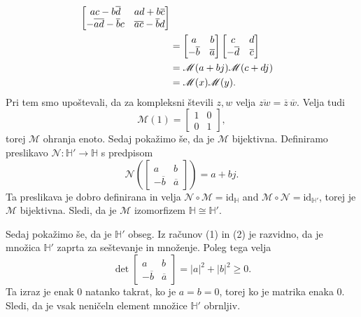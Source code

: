 \documentclass[mat1, tisk]{fmfdelo}
\numberwithin{equation}{section}
\begin{document}
\begin{dokaz}
\begin{equation*}
\begin{aligned}
\begin{bmatrix}
                    ac - b\overline{d} & ad + b\overline{c}\\
                    - \overline{ad} - \overline{b}c & {\overline{ac} - \overline{b}d}
                \end{bmatrix}\\
                &= \begin{bmatrix}
                    a & b\\
                    - \overline{b} & \overline{a}
                \end{bmatrix}
                \begin{bmatrix}
                    c & d\\
                    - \overline{d} & \overline{c}
                \end{bmatrix}\\
                &= \mathscr{M}(a+bj)\mathscr{M}(c+dj)\\
                &= \mathscr{M}(x)\mathscr{M}(y).
            \end{aligned}\\
    \end{equation*} Pri tem smo upoštevali, da za kompleksni števili $z,w$ velja $\overline{zw} = \overline{z}\,\overline{w}$.
    Velja tudi
    $$\mathscr{M}(1) = 
    \begin{bmatrix}
        1 & 0 \\
        0 & 1
    \end{bmatrix},$$
    torej $\mathscr{M}$ ohranja enoto. Sedaj pokažimo še, da je $\mathscr{M}$ bijektivna. Definiramo preslikavo \(\mathscr{N}:\mathbb{H}'\to\mathbb{H}\) s predpisom
    \[
    \mathscr{N}\!\left(
    \begin{bmatrix}
    a & b\\
    -\overline{b} & \overline{a}
    \end{bmatrix}
    \right)=a+bj.
    \]
    Ta preslikava je dobro definirana in velja
    \(\mathscr{N}\circ\mathscr{M}=\mathrm{id}_{\mathbb{H}}\) and 
    \(\mathscr{M}\circ\mathscr{N}=\mathrm{id}_{\mathbb{H}'}\), torej je \(\mathscr{M}\) bijektivna. Sledi, da je \(\mathscr{M}\) izomorfizem \(\mathbb{H} \cong \mathbb{H}'\).

    \medskip
    Sedaj pokažimo še, da je $\mathbb{H}'$ obseg. Iz računov (1) in (2) je razvidno, da je množica $\mathbb{H}'$ zaprta za seštevanje in množenje. Poleg tega
    velja
    $$\det 
    \begin{bmatrix}
        a & b\\
        - \overline{b} & \overline{a}
    \end{bmatrix}
    = |a|^2 + |b|^2 \geq 0.$$
    Ta izraz je enak 0 natanko takrat, ko je $a = b = 0$, torej ko je matrika enaka 0. Sledi, da je vsak neničeln element množice $\mathbb{H}'$ obrnljiv. 
    
\end{dokaz}
\end{document}
